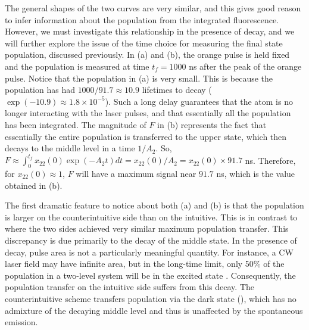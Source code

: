 \begin{figure}[tbp]
\bigskip
{}
\end{figure}

The general shapes of the two curves are very similar, and this gives good
reason to infer information about the population from the integrated
fluorescence.  However, we must investigate this relationship in the presence of
decay, and we will further explore the issue of the time choice for measuring
the final state population, discussed previously. 
In (a) and (b), the orange pulse is held fixed and the
population is measured at time $t_f = 1000$ ns after the peak of the orange
pulse.  Notice that the population in (a) is very small.  This is
because the population has had $1000/91.7 \approx 10.9$ lifetimes to decay
($\exp(-10.9) \approx 1.8 \times 10^{-5}$).  Such a long delay guarantees that
the atom is no longer interacting with the laser pulses, and that essentially
all the population has been integrated.   The magnitude of $F$ in (b)
represents the fact that essentially the entire population is transferred to the
upper state, which then decays to the middle level in a time $1/A_2$.  So, $F
\approx {\displaystyle \int}_0^{t_f} x_{22}(0) \exp(-A_2 t)dt = x_{22}(0)/A_2
=x_{22}(0) \times 91.7$ ns.  Therefore, for $x_{22}(0)\approx 1$, $F$ will have
a maximum signal near $91.7$ ns, which is the value obtained in (b).

The first dramatic feature to notice about both (a) and
(b) is that the population is larger on the counterintuitive side
than on the intuitive.  This is in contrast to  where the
two sides achieved very similar maximum population transfer.  This discrepancy
is due primarily to the decay of the middle state.  In the presence of decay,
pulse area is not a particularly meaningful quantity.  For instance, a CW laser
field may have infinite area, but in the long-time limit, only 50\% of the
population in a two-level system will be in the excited state \cite{Allen:87}. 
Consequently, the population transfer on the intuitive side suffers from this
decay.  The counterintuitive scheme transfers population via the dark state
(), which has no admixture of the decaying middle level and thus is
unaffected by the spontaneous emission.

